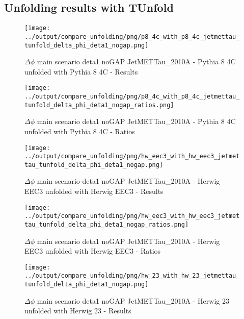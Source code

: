\documentclass[11pt]{book}
\begin{document}
\clearpage
\subsection{Unfolding results with TUnfold}

\begin{figure}[ht]
\centering
\texttt{[image: ../output/compare\_unfolding/png/p8\_4c\_with\_p8\_4c\_jetmettau\_tunfold\_delta\_phi\_deta1\_nogap.png]}
\caption{$\Delta\phi$ main scenario deta1 noGAP JetMETTau\_2010A - Pythia 8 4C unfolded with Pythia 8 4C - Results}
\label{p8_p8_jetmettau_tunfold_delta_phi_deta1_nogap_a}
\end{figure}

\begin{figure}[ht]
\centering
\texttt{[image: ../output/compare\_unfolding/png/p8\_4c\_with\_p8\_4c\_jetmettau\_tunfold\_delta\_phi\_deta1\_nogap\_ratios.png]}
\caption{$\Delta\phi$ main scenario deta1 noGAP JetMETTau\_2010A - Pythia 8 4C unfolded with Pythia 8 4C - Ratios}
\label{p8_p8_jetmettau_tunfold_delta_phi_deta1_nogap_b}
\end{figure}

\begin{figure}[ht]
\centering
\texttt{[image: ../output/compare\_unfolding/png/hw\_eec3\_with\_hw\_eec3\_jetmettau\_tunfold\_delta\_phi\_deta1\_nogap.png]}
\caption{$\Delta\phi$ main scenario deta1 noGAP JetMETTau\_2010A - Herwig EEC3 unfolded with Herwig EEC3 - Results}
\label{hw_eec3_hw_eec3_jetmettau_tunfold_delta_phi_deta1_nogap_a}
\end{figure}

\begin{figure}[ht]
\centering
\texttt{[image: ../output/compare\_unfolding/png/hw\_eec3\_with\_hw\_eec3\_jetmettau\_tunfold\_delta\_phi\_deta1\_nogap\_ratios.png]}
\caption{$\Delta\phi$ main scenario deta1 noGAP JetMETTau\_2010A - Herwig EEC3 unfolded with Herwig EEC3 - Ratios}
\label{hw_eec3_hw_eec3_jetmettau_tunfold_delta_phi_deta1_nogap_b}
\end{figure}

\begin{figure}[ht]
\centering
\texttt{[image: ../output/compare\_unfolding/png/hw\_23\_with\_hw\_23\_jetmettau\_tunfold\_delta\_phi\_deta1\_nogap.png]}
\caption{$\Delta\phi$ main scenario deta1 noGAP JetMETTau\_2010A - Herwig 23 unfolded with Herwig 23 - Results}
\label{hw_23_hw_23_jetmettau_tunfold_delta_phi_deta1_nogap_a}
\end{figure}
\end{document}
